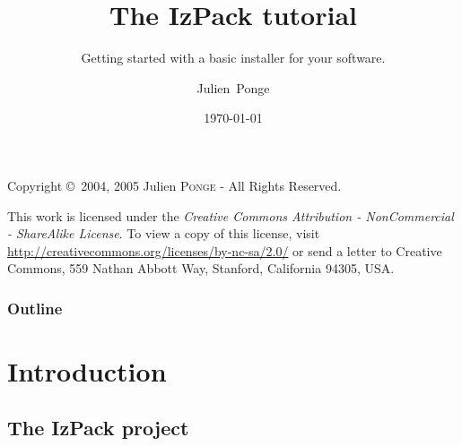 \documentclass[compress,10pt]{beamer}
\title{The IzPack tutorial}
\subtitle{Getting started with a basic installer for your software.}
\author{Julien~Ponge\inst{1}}
\institute
{
  \inst{1}%
  \texttt{<julien@izforge.com>}\\
  \url{http://www.izforge.com/}\\
  IzPack project founder and current maintainer.
}
\date{\today}
\begin{document}

\begin{frame}
  \titlepage
\end{frame}


\begin{frame}[plain]

\footnotesize

\href{http://www.creativecommons.org/}{}

\vspace{2em}

Copyright \copyright~2004, 2005 Julien \textsc{Ponge} - All Rights Reserved.

\vspace{2em}
\sloppy
This work is licensed under the \textit{Creative Commons
Attribution - NonCommercial - ShareAlike License}. To view a copy of this license,
visit
\href{http://creativecommons.org/licenses/by-nc-sa/2.0/}{\url{http://creativecommons.org/licenses/by-nc-sa/2.0/}}
or send a letter to Creative Commons, 559 Nathan Abbott Way, Stanford,
California 94305, USA.

\end{frame}


\begin{frame}
  \frametitle{Outline}
  \tableofcontents
\end{frame}


\section{Introduction}


\subsection{The IzPack project}

\end{document}
